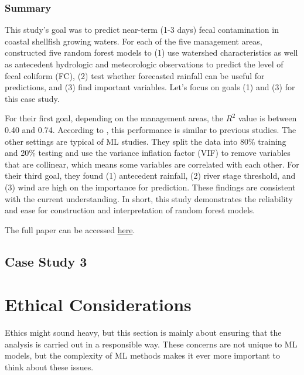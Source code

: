 \documentclass[
]{book}
\begin{document}
\hypertarget{summary-1}{%
\subsection{Summary}\label{summary-1}}

This study's goal was to predict near-term (1-3 days) fecal contamination in coastal shellfish growing waters. For each of the five management areas, \citet{chazal2024} constructed five random forest models to (1) use watershed characteristics as well as antecedent hydrologic and meteorologic observations to predict the level of fecal coliform (FC), (2) test whether forecasted rainfall can be useful for predictions, and (3) find important variables. Let's focus on goals (1) and (3) for this case study.

For their first goal, depending on the management areas, the \(R^2\) value is between 0.40 and 0.74. According to \citet{chazal2024}, this performance is similar to previous studies. The other settings are typical of ML studies. They split the data into 80\% training and 20\% testing and use the variance inflation factor (VIF) to remove variables that are collinear, which means some variables are correlated with each other. For their third goal, they found (1) antecedent rainfall, (2) river stage threshold, and (3) wind are high on the importance for prediction. These findings are consistent with the current understanding. In short, this study demonstrates the reliability and ease for construction and interpretation of random forest models.

The full paper can be accessed \href{https://www.sciencedirect.com/science/article/pii/S0025326X24000304?via\%3Dihub}{here}.

\hypertarget{case-study-3}{%
\section{Case Study 3}\label{case-study-3}}

\hypertarget{ethical-considerations}{%
\chapter{Ethical Considerations}\label{ethical-considerations}}

Ethics might sound heavy, but this section is mainly about ensuring that the analysis is carried out in a responsible way. These concerns are not unique to ML models, but the complexity of ML methods makes it ever more important to think about these issues.
\end{document}
